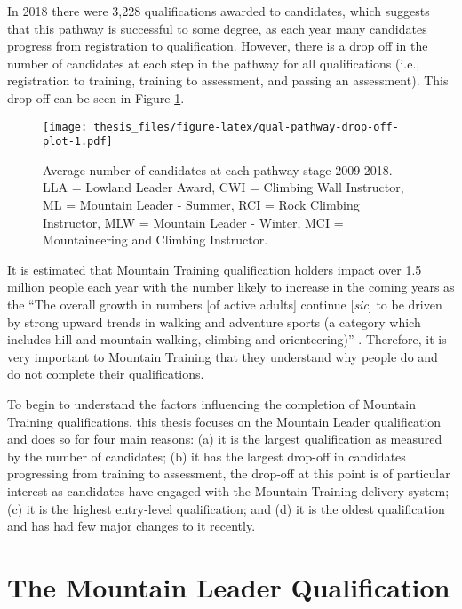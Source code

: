 \documentclass[
  12pt,
  a4paper,
]{book}
\begin{document}
In 2018 there were 3,228 qualifications awarded to candidates, which suggests that this pathway is successful to some degree, as each year many candidates progress from registration to qualification. However, there is a drop off in the number of candidates at each step in the pathway for all qualifications (i.e., registration to training, training to assessment, and passing an assessment). This drop off can be seen in Figure \ref{fig:qual-pathway-drop-off-plot}.

\begin{figure}
\centering
\texttt{[image: thesis\_files/figure-latex/qual-pathway-drop-off-plot-1.pdf]}
\caption{\label{fig:qual-pathway-drop-off-plot}Average number of candidates at each pathway stage 2009-2018. LLA = Lowland Leader Award, CWI = Climbing Wall Instructor, ML = Mountain Leader - Summer, RCI = Rock Climbing Instructor, MLW = Mountain Leader - Winter, MCI = Mountaineering and Climbing Instructor.}
\end{figure}

It is estimated that Mountain Training qualification holders impact over 1.5 million people each year \citep{MTE2019} with the number likely to increase in the coming years as the ``The overall growth in numbers {[}of active adults{]} continue {[}\emph{sic}{]} to be driven by strong upward trends in walking and adventure sports (a category which includes hill and mountain walking, climbing and orienteering)'' \citep[p 14]{SportEngland2020}. Therefore, it is very important to Mountain Training that they understand why people do and do not complete their qualifications.

To begin to understand the factors influencing the completion of Mountain Training qualifications, this thesis focuses on the Mountain Leader qualification and does so for four main reasons: (a) it is the largest qualification as measured by the number of candidates; (b) it has the largest drop-off in candidates progressing from training to assessment, the drop-off at this point is of particular interest as candidates have engaged with the Mountain Training delivery system; (c) it is the highest entry-level qualification; and (d) it is the oldest qualification and has had few major changes to it recently.

\hypertarget{the-mountain-leader-qualification}{%
\section{The Mountain Leader Qualification}\label{the-mountain-leader-qualification}}
\end{document}
